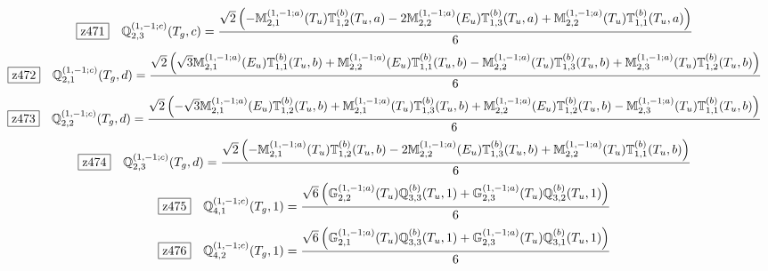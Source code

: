 \documentclass[fleqn,10pt,landscape]{jsarticle}
\begin{document}
\begin{dmath*}
\hspace*{3mm}\fbox{z471}\quad \mathbb{Q}_{2,3}^{(1,-1;c)}(T_{g},c)=\frac{\sqrt{2} \left(- \mathbb{M}_{2,1}^{(1,-1;a)}(T_{u}) \mathbb{T}_{1,2}^{(b)}(T_{u},a) - 2 \mathbb{M}_{2,2}^{(1,-1;a)}(E_{u}) \mathbb{T}_{1,3}^{(b)}(T_{u},a) + \mathbb{M}_{2,2}^{(1,-1;a)}(T_{u}) \mathbb{T}_{1,1}^{(b)}(T_{u},a)\right)}{6}
\end{dmath*}
\begin{dmath*}
\hspace*{3mm}\fbox{z472}\quad \mathbb{Q}_{2,1}^{(1,-1;c)}(T_{g},d)=\frac{\sqrt{2} \left(\sqrt{3} \mathbb{M}_{2,1}^{(1,-1;a)}(E_{u}) \mathbb{T}_{1,1}^{(b)}(T_{u},b) + \mathbb{M}_{2,2}^{(1,-1;a)}(E_{u}) \mathbb{T}_{1,1}^{(b)}(T_{u},b) - \mathbb{M}_{2,2}^{(1,-1;a)}(T_{u}) \mathbb{T}_{1,3}^{(b)}(T_{u},b) + \mathbb{M}_{2,3}^{(1,-1;a)}(T_{u}) \mathbb{T}_{1,2}^{(b)}(T_{u},b)\right)}{6}
\end{dmath*}
\begin{dmath*}
\hspace*{3mm}\fbox{z473}\quad \mathbb{Q}_{2,2}^{(1,-1;c)}(T_{g},d)=\frac{\sqrt{2} \left(- \sqrt{3} \mathbb{M}_{2,1}^{(1,-1;a)}(E_{u}) \mathbb{T}_{1,2}^{(b)}(T_{u},b) + \mathbb{M}_{2,1}^{(1,-1;a)}(T_{u}) \mathbb{T}_{1,3}^{(b)}(T_{u},b) + \mathbb{M}_{2,2}^{(1,-1;a)}(E_{u}) \mathbb{T}_{1,2}^{(b)}(T_{u},b) - \mathbb{M}_{2,3}^{(1,-1;a)}(T_{u}) \mathbb{T}_{1,1}^{(b)}(T_{u},b)\right)}{6}
\end{dmath*}
\begin{dmath*}
\hspace*{3mm}\fbox{z474}\quad \mathbb{Q}_{2,3}^{(1,-1;c)}(T_{g},d)=\frac{\sqrt{2} \left(- \mathbb{M}_{2,1}^{(1,-1;a)}(T_{u}) \mathbb{T}_{1,2}^{(b)}(T_{u},b) - 2 \mathbb{M}_{2,2}^{(1,-1;a)}(E_{u}) \mathbb{T}_{1,3}^{(b)}(T_{u},b) + \mathbb{M}_{2,2}^{(1,-1;a)}(T_{u}) \mathbb{T}_{1,1}^{(b)}(T_{u},b)\right)}{6}
\end{dmath*}
\begin{dmath*}
\hspace*{3mm}\fbox{z475}\quad \mathbb{Q}_{4,1}^{(1,-1;c)}(T_{g},1)=\frac{\sqrt{6} \left(\mathbb{G}_{2,2}^{(1,-1;a)}(T_{u}) \mathbb{Q}_{3,3}^{(b)}(T_{u},1) + \mathbb{G}_{2,3}^{(1,-1;a)}(T_{u}) \mathbb{Q}_{3,2}^{(b)}(T_{u},1)\right)}{6}
\end{dmath*}
\begin{dmath*}
\hspace*{3mm}\fbox{z476}\quad \mathbb{Q}_{4,2}^{(1,-1;c)}(T_{g},1)=\frac{\sqrt{6} \left(\mathbb{G}_{2,1}^{(1,-1;a)}(T_{u}) \mathbb{Q}_{3,3}^{(b)}(T_{u},1) + \mathbb{G}_{2,3}^{(1,-1;a)}(T_{u}) \mathbb{Q}_{3,1}^{(b)}(T_{u},1)\right)}{6}
\end{dmath*}
\end{document}

